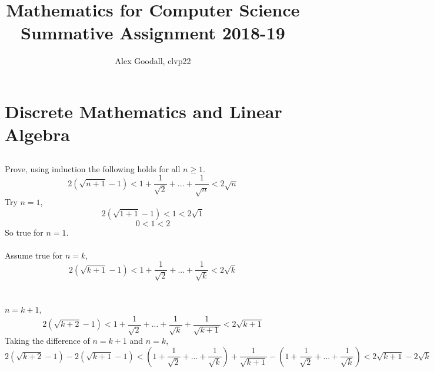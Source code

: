 \documentclass[]{article}
\title{Mathematics for Computer Science Summative Assignment 2018-19}
\author{Alex Goodall, clvp22} %
\begin{document}
\maketitle


\section{Discrete Mathematics and Linear Algebra}
\subsection{}
Prove, using induction the following holds for all $n\geq 1$.
$$2(\sqrt{n+1}-1)<1 + \frac{1}{\sqrt{2}} + ... + \frac{1}{\sqrt{n}} < 2\sqrt{n}$$
Try $n = 1$,
$$2(\sqrt{1+1}-1)<1< 2\sqrt{1}$$
$$0<1< 2$$
So true for $n =1$.
\\
\\
Assume true for $n = k$,
$$2(\sqrt{k+1}-1)<1 + \frac{1}{\sqrt{2}} + ... + \frac{1}{\sqrt{k}} < 2\sqrt{k}$$
\\
\\
$n = k +1$,
$$2(\sqrt{k+2}-1)<1 + \frac{1}{\sqrt{2}} + ... + \frac{1}{\sqrt{k}} + \frac{1}{\sqrt{k+1}} < 2\sqrt{k+1}$$
Taking the difference of $n = k+1$ and $n =k$,
$$2(\sqrt{k+2}-1) - 2(\sqrt{k+1} -1)<(1 + \frac{1}{\sqrt{2}} + ... + \frac{1}{\sqrt{k}}) + \frac{1}{\sqrt{k+1}} - (1 + \frac{1}{\sqrt{2}} + ... + \frac{1}{\sqrt{k}}) < 2\sqrt{k+1} - 2\sqrt{k}$$
\end{document}
